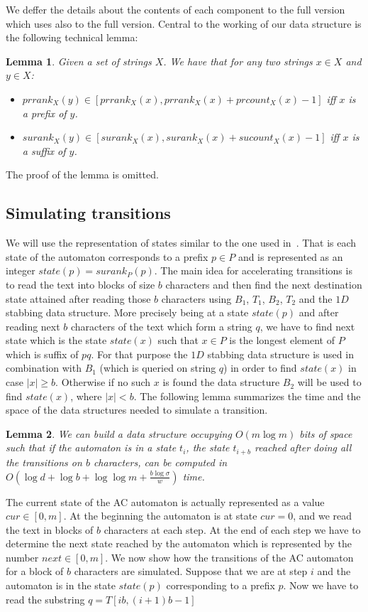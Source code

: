 \documentclass{article}
\newcommand{\?}{\mskip1.5mu}
\newtheorem{lemma}{Lemma}
\begin{document}
We deffer the details about the contents of each component to the full version which uses also to the full version.
Central to the working of our data structure is the following technical lemma:
\begin{lemma}
\label{lemma:tech_lemma}
Given a set of strings $X$. We have that for any two strings $x\in X$ and $y\in X$:
\begin{itemize}
\item $prrank_X(y)\in [prrank_X(x),prrank_X(x)+prcount_X(x)-1]$ iff $x$ is a prefix of $y$. 
\item $surank_X(y)\in [surank_X(x),surank_X(x)+sucount_X(x)-1]$ iff $x$ is a suffix of $y$.
\end{itemize}
\end{lemma}
The proof of the lemma is omitted.
\subsection{Simulating transitions}
\label{subsec:simul_trans}
We will use the representation of states similar to the one used in~\cite{B10a}. That is each state of the automaton corresponds to a prefix $p\in P$ and is represented as an integer $state(p)=surank_P(p)$. The main idea for accelerating transitions is to read the text into blocks of size $b$ characters and then find the next destination state attained after reading those $b$ characters using $B_1$, $T_1$, $B_2$, $T_2$ and the $1D$ stabbing data structure. More precisely being at a state $state(p)$ and after reading next $b$ characters of the text which form a string $q$, we have to find next state which is the state $state(x)$ such that $x\in P$ is the longest element of $P$ which is suffix of $pq$. For that purpose the $1D$ stabbing data structure is used in combination with $B_1$ (which is queried on string $q$) in order to find $state(x)$ in case $|x|\geq b$. Otherwise if no such $x$ is found the data structure $B_2$ will be used to find $state(x)$, where $|x|<b$. 
The following lemma summarizes the time and the space of the data structures needed to simulate a transition.  
\begin{lemma}
\label{lemma:trans_lemma}
We can build a data structure occupying $O(m\log m)$ bits of space such that if the automaton is in a state $t_i$, the state $t_{i+b}$ reached after doing all the transitions on $b$ characters, can be computed in $O(\log d+\log b+\log\log m+\frac{b\log\sigma}{w})$ time. 
\end{lemma}
The current state of the AC automaton is actually represented as a value $cur\in[0,m]$. At the beginning the automaton is at state $cur=0$, and we read the text in blocks of $b$ characters at each step. At the end of each step we have to determine the next state reached by the automaton which is represented by the number $next\in[0,m]$. We now show how the transitions of the AC automaton for a block of $b$ characters are simulated. Suppose that we are at step $i$ and the automaton is in the state $state(p)$ corresponding to a prefix $p$. Now we have to read the substring $q=T[ib,(i+1)b-1]$ 
\end{document}
